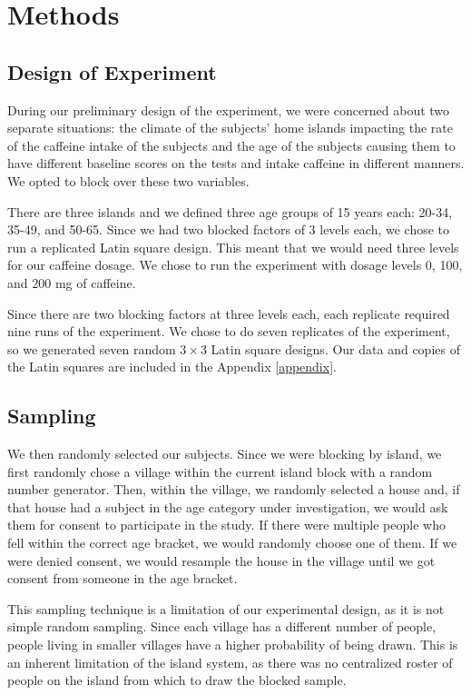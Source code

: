 \documentclass[11pt,a4paper,twoside]{tau-book}
\begin{document}
\section{Methods}

\subsection{Design of Experiment}
During our preliminary design of the experiment, we were concerned about two separate situations: the climate of the subjects’ home islands impacting the rate of the caffeine intake of the subjects and the age of the subjects causing them to have different baseline scores on the tests and intake caffeine in different manners. We opted to block over these two variables. 

There are three islands and we defined three age groups of 15 years each: 20-34, 35-49, and 50-65. Since we had two blocked factors of 3 levels each, we chose to run a replicated Latin square design. This meant that we would need three levels for our caffeine dosage. We chose to run the experiment with dosage levels 0, 100, and 200 mg of caffeine. 

Since there are two blocking factors at three levels each, each replicate required nine runs of the experiment. We chose to do seven replicates of the experiment, so we generated seven random $3\times3$ Latin square designs. Our data and copies of the Latin squares are included in the Appendix \ref{appendix}. 

\subsection{Sampling}
We then randomly selected our subjects. Since we were blocking by island, we first randomly chose a village within the current island block with a random number generator. Then, within the village, we randomly selected a house and, if that house had a subject in the age category under investigation, we would ask them for consent to participate in the study. If there were multiple people who fell within the correct age bracket, we would randomly choose one of them. If we were denied consent, we would resample the house in the village until we got consent from someone in the age bracket. 

This sampling technique is a limitation of our experimental design, as it is not simple random sampling. Since each village has a different number of people, people living in smaller villages have a higher probability of being drawn. This is an inherent limitation of the island system, as there was no centralized roster of people on the island from which to draw the blocked sample.
\end{document}

